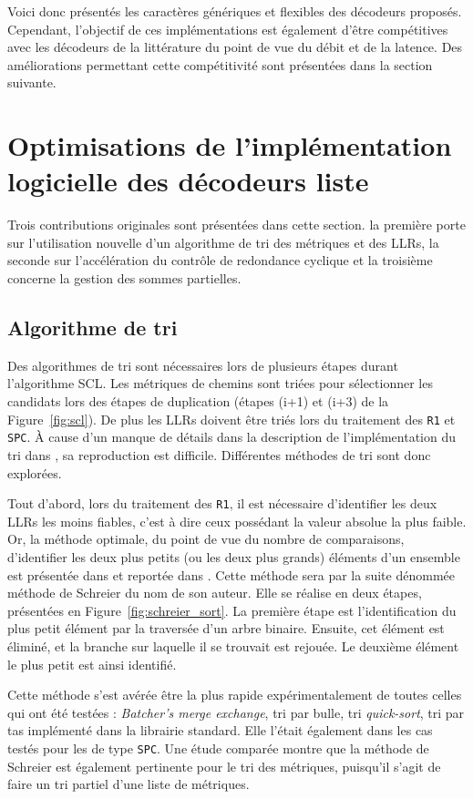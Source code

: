 Voici donc présentés les caractères génériques et flexibles des décodeurs proposés. Cependant, l'objectif de ces implémentations est également d'être compétitives avec les décodeurs de la littérature du point de vue du débit et de la latence. Des améliorations permettant cette compétitivité sont présentées dans la section suivante.

\section{Optimisations de l'implémentation logicielle des décodeurs liste}
\label{sec:opti_scl}
Trois contributions originales sont présentées dans cette section. la première porte sur l'utilisation nouvelle d'un algorithme de tri des métriques et des LLRs, la seconde sur l'accélération du contrôle de redondance cyclique et la troisième concerne la gestion des sommes partielles. 

\subsection{Algorithme de tri}
Des algorithmes de tri sont nécessaires lors de plusieurs étapes durant l'algorithme SCL. Les métriques de chemins sont triées pour sélectionner les candidats lors des étapes de duplication (étapes (i+1) et (i+3) de la Figure~\ref{fig:scl}). De plus les LLRs doivent être triés lors du traitement des \noeuds \texttt{R1} et \texttt{SPC}. \`A cause d'un manque de détails dans la description de l'implémentation du tri dans \cite{sarkis_fast_2016}, sa reproduction est difficile. Différentes méthodes de tri sont donc explorées.

Tout d'abord, lors du traitement des \noeuds \texttt{R1}, il est nécessaire d'identifier les deux LLRs les moins fiables, c'est à dire ceux possédant la valeur absolue la plus faible. Or, la méthode optimale, du point de vue du nombre de comparaisons, d'identifier les deux plus petits (ou les deux plus grands) éléments d'un ensemble est présentée dans \cite{schreier_tournament_1932} et reportée dans \cite{knuth_art_1973}. Cette méthode sera par la suite dénommée méthode de Schreier du nom de son auteur. Elle se réalise en deux étapes, présentées en Figure~\ref{fig:schreier_sort}. La première étape est l'identification du plus petit élément par la traversée d'un arbre binaire. Ensuite, cet élément est éliminé, et la branche sur laquelle il se trouvait est rejouée. Le deuxième élément le plus petit est ainsi identifié.

Cette méthode s'est avérée être la plus rapide expérimentalement de toutes celles qui ont été testées : \textit{Batcher's merge exchange}, tri par bulle, tri \textit{quick-sort}, tri par tas implémenté dans la librairie standard. Elle l'était également dans les cas testés pour les \noeuds de type \texttt{SPC}. Une étude comparée montre que la méthode de Schreier est également pertinente pour le tri des métriques, puisqu'il s'agit de faire un tri partiel d'une liste de métriques.

